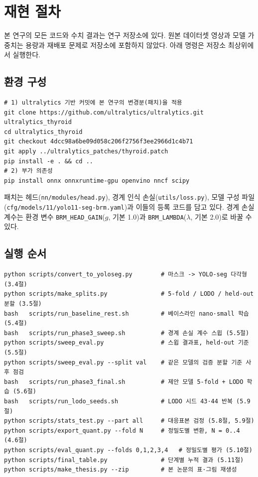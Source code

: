
\chapter{재현 절차}\label{app:repro}

본 연구의 모든 코드와 수치 결과는 연구 저장소에 있다. 원본 데이터셋 영상과 모델 가중치는 용량과 재배포
문제로 저장소에 포함하지 않았다. 아래 명령은 저장소 최상위에서 실행한다.

\section{환경 구성}

\begin{small}
\begin{verbatim}
# 1) ultralytics 기반 커밋에 본 연구의 변경분(패치)을 적용
git clone https://github.com/ultralytics/ultralytics.git ultralytics_thyroid
cd ultralytics_thyroid
git checkout 4dcc98a6be09d058c206f2756f3ee2966d1c4b71
git apply ../ultralytics_patches/thyroid.patch
pip install -e . && cd ..
# 2) 부가 의존성
pip install onnx onnxruntime-gpu openvino nncf scipy
\end{verbatim}
\end{small}

패치는 \BRM{} 헤드(\texttt{nn/modules/head.py}), 경계 인식 손실(\texttt{utils/loss.py}), 모델 구성 파일
(\texttt{cfg/models/11/yolo11-seg-brm.yaml})과 이들의 등록 코드를 담고 있다. 경계 손실 계수는 환경 변수
\texttt{BRM\_HEAD\_GAIN}($g$, 기본 1.0)과 \texttt{BRM\_LAMBDA}($\lambda$, 기본 2.0)로 바꿀 수 있다.

\section{실행 순서}

\begin{small}
\begin{verbatim}
python scripts/convert_to_yoloseg.py        # 마스크 -> YOLO-seg 다각형 (3.4절)
python scripts/make_splits.py               # 5-fold / LODO / held-out 분할 (3.5절)
bash   scripts/run_baseline_rest.sh         # 베이스라인 nano·small 학습 (5.4절)
bash   scripts/run_phase3_sweep.sh          # 경계 손실 계수 스윕 (5.5절)
python scripts/sweep_eval.py                # 스윕 결과표, held-out 기준 (5.5절)
python scripts/sweep_eval.py --split val    # 같은 모델의 검증 분할 기준 사후 점검
bash   scripts/run_phase3_final.sh          # 제안 모델 5-fold + LODO 학습 (5.6절)
bash   scripts/run_lodo_seeds.sh            # LODO 시드 43·44 반복 (5.9절)
python scripts/stats_test.py --part all     # 대응표본 검정 (5.8절, 5.9절)
python scripts/export_quant.py --fold N     # 정밀도별 변환, N = 0..4 (4.6절)
python scripts/eval_quant.py --folds 0,1,2,3,4   # 정밀도별 평가 (5.10절)
python scripts/final_table.py               # 단계별 누적 결과 (5.11절)
python scripts/make_thesis.py --zip         # 본 논문의 표·그림 재생성
\end{verbatim}
\end{small}

